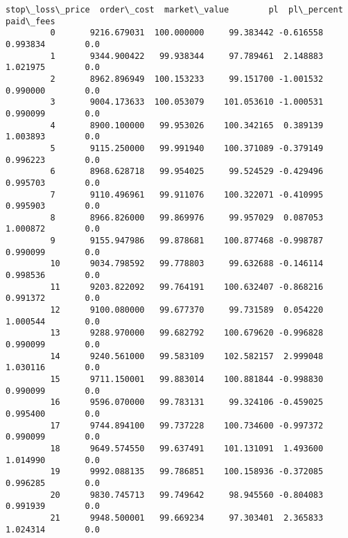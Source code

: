 \documentclass[11pt]{article}
\begin{document}
\begin{Verbatim}[commandchars=\\\{\}]
             stop\_loss\_price  order\_cost  market\_value        pl  pl\_percent  paid\_fees  
         0       9216.679031  100.000000     99.383442 -0.616558    0.993834        0.0  
         1       9344.900422   99.938344     97.789461  2.148883    1.021975        0.0  
         2       8962.896949  100.153233     99.151700 -1.001532    0.990000        0.0  
         3       9004.173633  100.053079    101.053610 -1.000531    0.990099        0.0  
         4       8900.100000   99.953026    100.342165  0.389139    1.003893        0.0  
         5       9115.250000   99.991940    100.371089 -0.379149    0.996223        0.0  
         6       8968.628718   99.954025     99.524529 -0.429496    0.995703        0.0  
         7       9110.496961   99.911076    100.322071 -0.410995    0.995903        0.0  
         8       8966.826000   99.869976     99.957029  0.087053    1.000872        0.0  
         9       9155.947986   99.878681    100.877468 -0.998787    0.990099        0.0  
         10      9034.798592   99.778803     99.632688 -0.146114    0.998536        0.0  
         11      9203.822092   99.764191    100.632407 -0.868216    0.991372        0.0  
         12      9100.080000   99.677370     99.731589  0.054220    1.000544        0.0  
         13      9288.970000   99.682792    100.679620 -0.996828    0.990099        0.0  
         14      9240.561000   99.583109    102.582157  2.999048    1.030116        0.0  
         15      9711.150001   99.883014    100.881844 -0.998830    0.990099        0.0  
         16      9596.070000   99.783131     99.324106 -0.459025    0.995400        0.0  
         17      9744.894100   99.737228    100.734600 -0.997372    0.990099        0.0  
         18      9649.574550   99.637491    101.131091  1.493600    1.014990        0.0  
         19      9992.088135   99.786851    100.158936 -0.372085    0.996285        0.0  
         20      9830.745713   99.749642     98.945560 -0.804083    0.991939        0.0  
         21      9948.500001   99.669234     97.303401  2.365833    1.024314        0.0  
\end{Verbatim}
            

    
    
    
    
\end{document}
